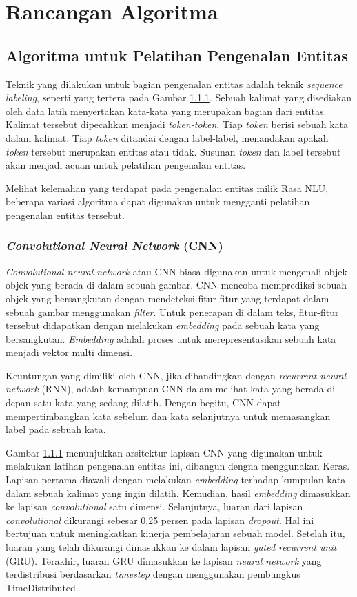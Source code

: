 \chapter{Rancangan Algoritma}

\section{Algoritma untuk Pelatihan Pengenalan Entitas}

Teknik yang dilakukan untuk bagian pengenalan entitas adalah teknik \textit{sequence labeling}, seperti yang tertera pada Gambar \ref{}. Sebuah kalimat yang disediakan oleh data latih menyertakan kata-kata yang merupakan bagian dari entitas. Kalimat tersebut dipecahkan menjadi \textit{token-token}. Tiap \textit{token} berisi sebuah kata dalam kalimat. Tiap \textit{token} ditandai dengan label-label, menandakan apakah \textit{token} tersebut merupakan entitas atau tidak. Susunan \textit{token} dan label tersebut akan menjadi acuan untuk pelatihan pengenalan entitas.

Melihat kelemahan yang terdapat pada pengenalan entitas milik Rasa NLU, beberapa variasi algoritma dapat digunakan untuk mengganti pelatihan pengenalan entitas tersebut.

\subsection{\textit{Convolutional Neural Network} (CNN)}

\textit{Convolutional neural network} atau CNN biasa digunakan untuk mengenali objek-objek yang berada di dalam sebuah gambar. CNN mencoba memprediksi sebuah objek yang bersangkutan dengan mendeteksi fitur-fitur yang terdapat dalam sebuah gambar menggunakan \textit{filter}. Untuk penerapan di dalam teks, fitur-fitur tersebut didapatkan dengan melakukan \textit{embedding} pada sebuah kata yang bersangkutan. \textit{Embedding} adalah proses untuk merepresentasikan sebuah kata menjadi vektor multi dimensi.

Keuntungan yang dimiliki oleh CNN, jika dibandingkan dengan \textit{recurrent neural network} (RNN), adalah kemampuan CNN dalam melihat kata yang berada di depan satu kata yang sedang dilatih. Dengan begitu, CNN dapat mempertimbangkan kata sebelum dan kata selanjutnya untuk memasangkan label pada sebuah kata.

Gambar \ref{} menunjukkan arsitektur lapisan CNN yang digunakan untuk melakukan latihan pengenalan entitas ini, dibangun dengna menggunakan Keras. Lapisan pertama diawali dengan melakukan \textit{embedding} terhadap kumpulan kata dalam sebuah kalimat yang ingin dilatih. Kemudian, hasil \textit{embedding} dimasukkan ke lapisan \textit{convolutional} satu dimensi. Selanjutnya, luaran dari lapisan \textit{convolutional} dikurangi sebesar 0,25 persen pada lapisan \textit{dropout}. Hal ini bertujuan untuk meningkatkan kinerja pembelajaran sebuah model. Setelah itu, luaran yang telah dikurangi dimasukkan ke dalam lapisan \textit{gated recurrent unit} (GRU). Terakhir, luaran GRU dimasukkan ke lapisan \textit{neural network} yang terdistribusi berdasarkan \textit{timestep} dengan menggunakan pembungkus TimeDistributed.


